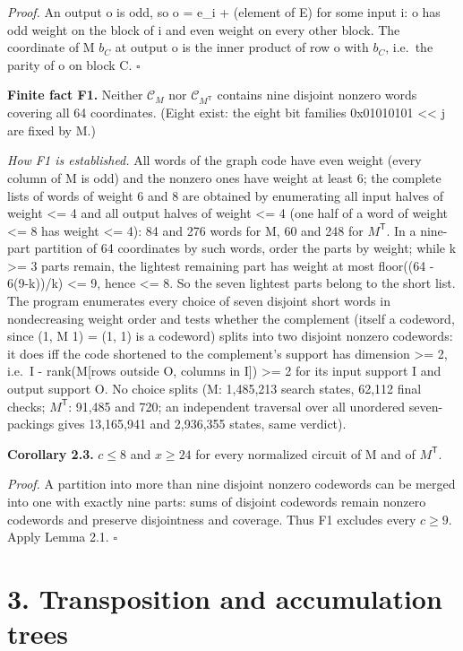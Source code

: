 \emph{Proof.} An output o is odd, so o = e\_i + (element of E) for some input i: o has odd weight on the block of i and even weight on every other block. The coordinate of M \(b_C\) at output o is the inner product of row o with \(b_C\), i.e.~the parity of o on block C. \(\square\)

\textbf{Finite fact F1.} Neither \(\mathcal C_M\) nor \(\mathcal C_{M^{\mathsf T}}\) contains nine disjoint nonzero words covering all 64 coordinates. (Eight exist: the eight bit families 0x01010101 \textless\textless{} j are fixed by M.)

\emph{How F1 is established.} All words of the graph code have even weight (every column of M is odd) and the nonzero ones have weight at least 6; the complete lists of words of weight 6 and 8 are obtained by enumerating all input halves of weight \textless= 4 and all output halves of weight \textless= 4 (one half of a word of weight \textless= 8 has weight \textless= 4): 84 and 276 words for M, 60 and 248 for \(M^{\mathsf T}\). In a nine-part partition of 64 coordinates by such words, order the parts by weight; while k \textgreater= 3 parts remain, the lightest remaining part has weight at most floor((64 - 6(9-k))/k) \textless= 9, hence \textless= 8. So the seven lightest parts belong to the short list. The program enumerates every choice of seven disjoint short words in nondecreasing weight order and tests whether the complement (itself a codeword, since (1, M 1) = (1, 1) is a codeword) splits into two disjoint nonzero codewords: it does iff the code shortened to the complement's support has dimension \textgreater= 2, i.e.~\textbar I\textbar{} - rank(M{[}rows outside O, columns in I{]}) \textgreater= 2 for its input support I and output support O. No choice splits (M: 1,485,213 search states, 62,112 final checks; \(M^{\mathsf T}\): 91,485 and 720; an independent traversal over all unordered seven-packings gives 13,165,941 and 2,936,355 states, same verdict).

\textbf{Corollary 2.3.} \(c\le8\) and \(x\ge24\) for every normalized circuit of M and of \(M^{\mathsf T}\).

\emph{Proof.} A partition into more than nine disjoint nonzero codewords can be merged into one with exactly nine parts: sums of disjoint codewords remain nonzero codewords and preserve disjointness and coverage. Thus F1 excludes every \(c\ge9\). Apply Lemma 2.1. \(\square\)

\hypertarget{transposition-and-accumulation-trees}{%
\section{3. Transposition and accumulation trees}\label{transposition-and-accumulation-trees}}

